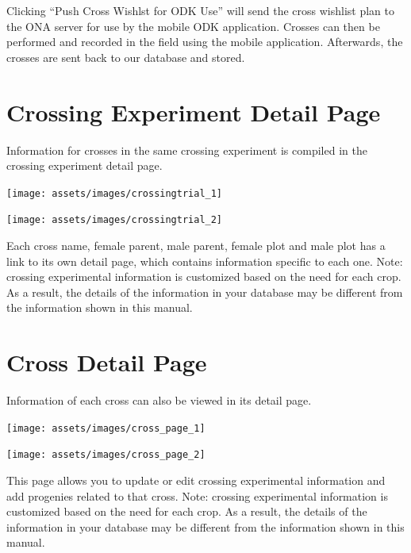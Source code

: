 \documentclass[
  12pt,
]{book}
\begin{document}
Clicking ``Push Cross Wishlst for ODK Use'' will send the cross wishlist plan to the ONA server for use by the mobile ODK application. Crosses can then be performed and recorded in the field using the mobile application. Afterwards, the crosses are sent back to our database and stored.

\hypertarget{crossing-experiment-detail-page}{%
\section{Crossing Experiment Detail Page}\label{crossing-experiment-detail-page}}

Information for crosses in the same crossing experiment is compiled in the crossing experiment detail page.

\begin{center}\texttt{[image: assets/images/crossingtrial\_1]} \end{center}

\begin{center}\texttt{[image: assets/images/crossingtrial\_2]} \end{center}

Each cross name, female parent, male parent, female plot and male plot has a link to its own detail page, which contains information specific to each one. Note: crossing experimental information is customized based on the need for each crop. As a result, the details of the information in your database may be different from the information shown in this manual.

\hypertarget{cross-detail-page}{%
\section{Cross Detail Page}\label{cross-detail-page}}

Information of each cross can also be viewed in its detail page.

\begin{center}\texttt{[image: assets/images/cross\_page\_1]} \end{center}

\begin{center}\texttt{[image: assets/images/cross\_page\_2]} \end{center}

This page allows you to update or edit crossing experimental information and add progenies related to that cross. Note: crossing experimental information is customized based on the need for each crop. As a result, the details of the information in your database may be different from the information shown in this manual.
\end{document}

